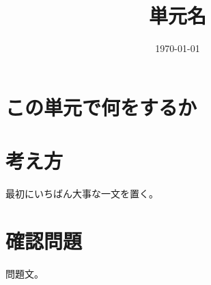 \documentclass[a4paper,11pt]{ltjsarticle}
\title{単元名}
\author{}
\date{\today}
\begin{document}
\maketitle

\section{この単元で何をするか}

\section{考え方}

\begin{point}
  最初にいちばん大事な一文を置く。
\end{point}

\section{確認問題}
\begin{question}
  問題文。
\end{question}
\end{document}
